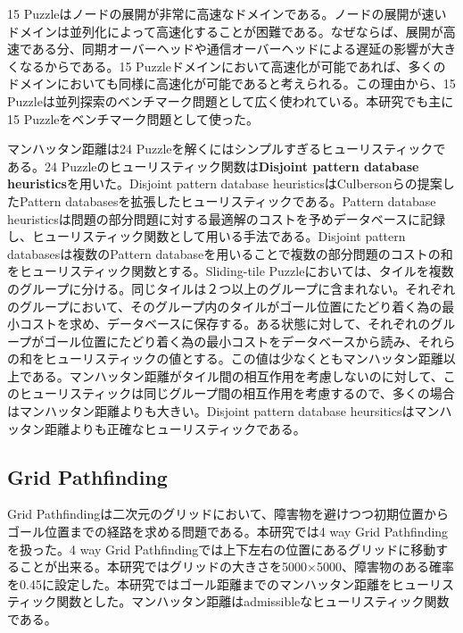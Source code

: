 \documentclass[uplatex]{jsarticle}
\begin{document}
15 Puzzleはノードの展開が非常に高速なドメインである。ノードの展開が速いドメインは並列化によって高速化することが困難である。なぜならば、展開が高速である分、同期オーバーヘッドや通信オーバーヘッドによる遅延の影響が大きくなるからである。15 Puzzleドメインにおいて高速化が可能であれば、多くのドメインにおいても同様に高速化が可能であると考えられる。この理由から、15 Puzzleは並列探索のベンチマーク問題として広く使われている。本研究でも主に15 Puzzleをベンチマーク問題として使った。
\newline

マンハッタン距離は24 Puzzleを解くにはシンプルすぎるヒューリスティックである。24 Puzzleのヒューリスティック関数は\textbf{Disjoint pattern database heuristics}を用いた\cite{Korf2002}。Disjoint pattern database heuristicsはCulbersonらの提案したPattern databasesを拡張したヒューリスティックである。Pattern database heuristicsは問題の部分問題に対する最適解のコストを予めデータベースに記録し、ヒューリスティック関数として用いる手法である\cite{Culberson1998pattern}。Disjoint pattern databasesは複数のPattern databaseを用いることで複数の部分問題のコストの和をヒューリスティック関数とする。Sliding-tile Puzzleにおいては、タイルを複数のグループに分ける。同じタイルは２つ以上のグループに含まれない。それぞれのグループにおいて、そのグループ内のタイルがゴール位置にたどり着く為の最小コストを求め、データベースに保存する。ある状態に対して、それぞれのグループがゴール位置にたどり着く為の最小コストをデータベースから読み、それらの和をヒューリスティックの値とする。この値は少なくともマンハッタン距離以上である。マンハッタン距離がタイル間の相互作用を考慮しないのに対して、このヒューリスティックは同じグループ間の相互作用を考慮するので、多くの場合はマンハッタン距離よりも大きい。Disjoint pattern database heursiticsはマンハッタン距離よりも正確なヒューリスティックである。


\subsection{Grid Pathfinding}

Grid Pathfindingは二次元のグリッドにおいて、障害物を避けつつ初期位置からゴール位置までの経路を求める問題である。本研究では4 way Grid Pathfindingを扱った。4 way Grid Pathfindingでは上下左右の位置にあるグリッドに移動することが出来る。本研究ではグリッドの大きさを5000$\times$5000、障害物のある確率を0.45に設定した。本研究ではゴール距離までのマンハッタン距離をヒューリスティック関数とした。マンハッタン距離はadmissibleなヒューリスティック関数である。
\end{document}
